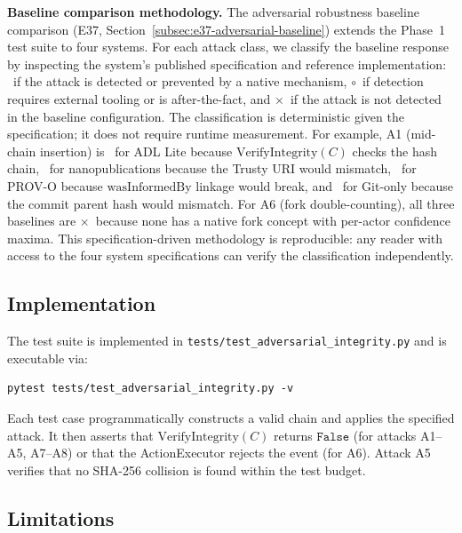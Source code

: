 \textbf{Baseline comparison methodology.} The adversarial robustness baseline comparison (E37, Section~\ref{subsec:e37-adversarial-baseline}) extends the Phase~1 test suite to four systems. For each attack class, we classify the baseline response by inspecting the system's published specification and reference implementation: \checkmark\ if the attack is detected or prevented by a native mechanism, $\circ$\ if detection requires external tooling or is after-the-fact, and $\times$\ if the attack is not detected in the baseline configuration. The classification is deterministic given the specification; it does not require runtime measurement. For example, A1 (mid-chain insertion) is \checkmark\ for ADL Lite because $\text{VerifyIntegrity}(C)$ checks the hash chain, \checkmark\ for nanopublications because the Trusty URI would mismatch, \checkmark\ for PROV-O because $\text{wasInformedBy}$ linkage would break, and \checkmark\ for Git-only because the commit parent hash would mismatch. For A6 (fork double-counting), all three baselines are $\times$\ because none has a native fork concept with per-actor confidence maxima. This specification-driven methodology is reproducible: any reader with access to the four system specifications can verify the classification independently.

\subsection{Implementation}

The test suite is implemented in \texttt{tests/test\_adversarial\_integrity.py} and is executable via:
\begin{verbatim}
pytest tests/test_adversarial_integrity.py -v
\end{verbatim}
Each test case programmatically constructs a valid chain and applies the specified attack. It then asserts that $\text{VerifyIntegrity}(C)$ returns $\texttt{False}$ (for attacks A1--A5, A7--A8) or that the ActionExecutor rejects the event (for A6). Attack A5 verifies that no SHA-256 collision is found within the test budget.

\subsection{Limitations}

